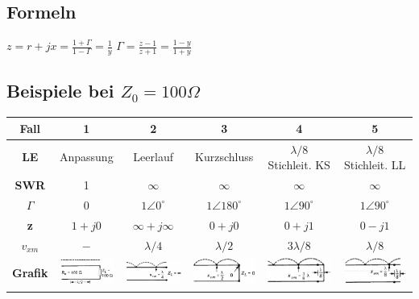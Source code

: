 \subsection{Formeln}
	$z=r+jx=\frac{1+\Gamma}{1-\Gamma}=\frac{1}{y}$ \qquad
	$\Gamma=\frac{z-1}{z+1}=\frac{1-y}{1+y}$
	
\subsection{Beispiele bei $Z_0=100\Omega$}
		\renewcommand{\arraystretch}{1.1}
		\begin{tabular}{| c | c | c | c | c | c |}
			\hline
				\textbf{Fall}
				& 1
				& 2 
				& 3
				& 4
				& 5 \\
			\hline
				\textbf{LE}
				& Anpassung
				& Leerlauf
				& Kurzschluss
				& $\lambda/8$ Stichleit. KS
				& $\lambda/8$ Stichleit. LL \\
			\hline
				\textbf{SWR}
				& 1
				& $\infty$
				& $\infty$
				& $\infty$
				& $\infty$ \\
			\hline
				\textbf{$\Gamma$}
				& $0$
				& $1 \angle 0 ^\circ$
				& $1 \angle 180 ^\circ$
				& $1 \angle 90 ^\circ$
				& $1 \angle 90 ^\circ$\\
			\hline
				\textbf{z}
				& $1+j0$
				& $\infty+j\infty$
				& $0+j0$
				& $0+j1$
				& $0-j1$ \\
			\hline
				\textbf{$v_{xm}$}
				& $-$
				& $\lambda/4$
				& $\lambda/2$
				& $3\lambda/8$
				& $\lambda/8$ \\
			\hline
				\textbf{Grafik}
				& \includegraphics[height=0.9cm]{./bilder/Fall1.png}
				& \includegraphics[height=0.9cm]{./bilder/Fall2.png}
				& \includegraphics[height=0.9cm]{./bilder/Fall3.png}
				& \includegraphics[height=0.9cm]{./bilder/Fall4.png}
				& \includegraphics[height=0.9cm]{./bilder/Fall5.png} \\
			\hline
		\end{tabular}
		\renewcommand{\arraystretch}{1}
		
